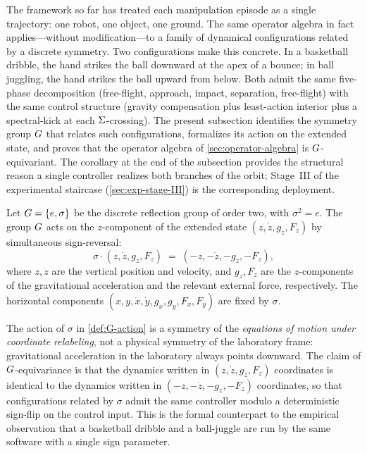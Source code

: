 The framework so far has treated each manipulation episode as a
single trajectory: one robot, one object, one ground. The same
operator algebra in fact applies---without modification---to a
family of dynamical configurations related by a discrete symmetry.
Two configurations make this concrete. In a basketball dribble,
the hand strikes the ball downward at the apex of a bounce; in
ball juggling, the hand strikes the ball upward from below. Both
admit the same five-phase decomposition (free-flight, approach,
impact, separation, free-flight) with the same control structure
(gravity compensation plus least-action interior plus a
spectral-kick at each $\Sigma$-crossing). The present subsection
identifies the symmetry group $G$ that relates such
configurations, formalizes its action on the extended state, and
proves that the operator algebra of \cref{sec:operator-algebra}
is $G$-equivariant. The corollary at the end of the
subsection provides the structural reason a single controller
realizes both branches of the orbit; Stage~III of the experimental
staircase (\cref{sec:exp-stage-III}) is the corresponding
deployment.

\begin{definition}
\label{def:G-action}
Let $G = \{e, \sigma\}$ be the discrete reflection group
of order two, with $\sigma^{2} = e$. The group $G$ acts
on the $z$-component of the extended state $(z, \dot z, g_{z},
F_{z})$ by simultaneous sign-reversal:
\[
  \sigma \cdot (z, \dot z, g_{z}, F_{z})
  \;=\;
  (-z, -\dot z, -g_{z}, -F_{z}),
\]
where $z, \dot z$ are the vertical position and velocity, and
$g_{z}, F_{z}$ are the $z$-components of the gravitational
acceleration and the relevant external force, respectively. The
horizontal components $(x, y, \dot x, \dot y, g_{x}, g_{y},
F_{x}, F_{y})$ are fixed by $\sigma$.
\end{definition}

\begin{remark}
\label{rem:G-coord-sym}
The action of $\sigma$ in \cref{def:G-action} is a symmetry of
the \emph{equations of motion under coordinate relabeling}, not a
physical symmetry of the laboratory frame: gravitational
acceleration in the laboratory always points downward. The claim
of $G$-equivariance is that the dynamics written in
$(z, \dot z, g_{z}, F_{z})$ coordinates is identical to the
dynamics written in $(-z, -\dot z, -g_{z}, -F_{z})$ coordinates,
so that configurations related by $\sigma$ admit the same
controller modulo a deterministic sign-flip on the control
input. This is the formal counterpart to the empirical
observation that a basketball dribble and a ball-juggle are run
by the same software with a single sign parameter.
\end{remark}

